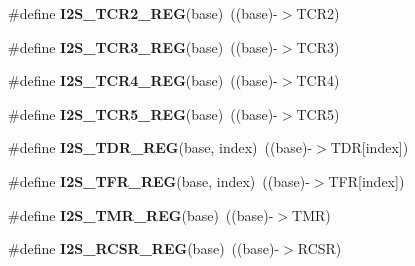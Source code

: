 \begin{DoxyCompactItemize}
\item 
\#define {\bfseries I2\+S\+\_\+\+T\+C\+R2\+\_\+\+R\+EG}(base)~((base)-\/$>$T\+C\+R2)\hypertarget{group__I2S__Register__Accessor__Macros_ga078d8dfc2a79cc117a21465f60d37918}{}\label{group__I2S__Register__Accessor__Macros_ga078d8dfc2a79cc117a21465f60d37918}

\item 
\#define {\bfseries I2\+S\+\_\+\+T\+C\+R3\+\_\+\+R\+EG}(base)~((base)-\/$>$T\+C\+R3)\hypertarget{group__I2S__Register__Accessor__Macros_ga20ca4a7340fc7ac9a14c313d2b0c0392}{}\label{group__I2S__Register__Accessor__Macros_ga20ca4a7340fc7ac9a14c313d2b0c0392}

\item 
\#define {\bfseries I2\+S\+\_\+\+T\+C\+R4\+\_\+\+R\+EG}(base)~((base)-\/$>$T\+C\+R4)\hypertarget{group__I2S__Register__Accessor__Macros_gab20e23ff9fad28fd3dfde2110061289e}{}\label{group__I2S__Register__Accessor__Macros_gab20e23ff9fad28fd3dfde2110061289e}

\item 
\#define {\bfseries I2\+S\+\_\+\+T\+C\+R5\+\_\+\+R\+EG}(base)~((base)-\/$>$T\+C\+R5)\hypertarget{group__I2S__Register__Accessor__Macros_ga4ac04958932172b137ecb3eaca03cda0}{}\label{group__I2S__Register__Accessor__Macros_ga4ac04958932172b137ecb3eaca03cda0}

\item 
\#define {\bfseries I2\+S\+\_\+\+T\+D\+R\+\_\+\+R\+EG}(base,  index)~((base)-\/$>$T\+DR\mbox{[}index\mbox{]})\hypertarget{group__I2S__Register__Accessor__Macros_ga0c6906e2715aabf27a2eb2a42af14527}{}\label{group__I2S__Register__Accessor__Macros_ga0c6906e2715aabf27a2eb2a42af14527}

\item 
\#define {\bfseries I2\+S\+\_\+\+T\+F\+R\+\_\+\+R\+EG}(base,  index)~((base)-\/$>$T\+FR\mbox{[}index\mbox{]})\hypertarget{group__I2S__Register__Accessor__Macros_gae0f97e86f9a784060d1e9b01fe5c49b8}{}\label{group__I2S__Register__Accessor__Macros_gae0f97e86f9a784060d1e9b01fe5c49b8}

\item 
\#define {\bfseries I2\+S\+\_\+\+T\+M\+R\+\_\+\+R\+EG}(base)~((base)-\/$>$T\+MR)\hypertarget{group__I2S__Register__Accessor__Macros_ga69469ef04acc4f7702d0bf79c541bbca}{}\label{group__I2S__Register__Accessor__Macros_ga69469ef04acc4f7702d0bf79c541bbca}

\item 
\#define {\bfseries I2\+S\+\_\+\+R\+C\+S\+R\+\_\+\+R\+EG}(base)~((base)-\/$>$R\+C\+SR)\hypertarget{group__I2S__Register__Accessor__Macros_ga41969cdffb776b0b7f133fb2702b76c8}{}\label{group__I2S__Register__Accessor__Macros_ga41969cdffb776b0b7f133fb2702b76c8}


\end{DoxyCompactItemize}
